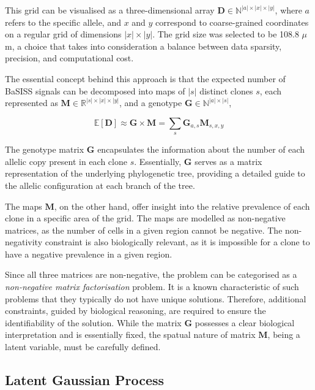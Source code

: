 This grid can be visualised as a three-dimensional array $\mathbf{D} \in \mathbb{N}^{|a| \times |x| \times |y|}$, where $a$ refers to the specific allele, and $x$ and $y$ correspond to coarse-grained coordinates on a regular grid of dimensions $|x| \times |y|$. The grid size was selected to be 108.8 $\mu$ m, a choice that takes into consideration a balance between data sparsity, precision, and computational cost.

The essential concept behind this approach is that the expected number of \ac{BaSISS} signals can be decomposed into maps of $|s|$ distinct clones $s$, each represented as $\mathbf{M} \in \mathbb{R}^{|s| \times |x| \times |y|}$, and a genotype $\mathbf{G} \in \mathbb{N}^{|a| \times |s|}$,

\begin{equation}
    \mathbb{E}[\mathbf{D}] \approx \mathbf{G} \times \mathbf{M} = \sum_{s} \mathbf{G}_{a, s} \mathbf{M}_{s, x, y}
    \label{eq:ED}
\end{equation}

The genotype matrix $\mathbf{G}$ encapsulates the information about the number of each allelic copy present in each clone $s$. Essentially, $\mathbf{G}$ serves as a matrix representation of the underlying phylogenetic tree, providing a detailed guide to the allelic configuration at each branch of the tree. 

The maps $\mathbf{M}$, on the other hand, offer insight into the relative prevalence of each clone in a specific area of the grid. The maps are modelled as non-negative matrices, as the number of cells in a given region cannot be negative. The non-negativity constraint is also biologically relevant, as it is impossible for a clone to have a negative prevalence in a given region.

Since all three matrices are non-negative, the problem can be categorised as a \emph{non-negative matrix factorisation} problem. It is a known characteristic of such problems that they typically do not have unique solutions. Therefore, additional constraints, guided by biological reasoning, are required to ensure the identifiability of the solution. While the matrix $\mathbf{G}$ possesses a clear biological interpretation and is essentially fixed, the spatual nature of matrix $\mathbf{M}$, being a latent variable, must be carefully defined.

\subsection{Latent Gaussian Process}

